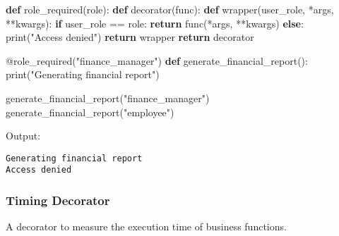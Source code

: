 \documentclass[
  letterpaper,
  DIV=11,
  numbers=noendperiod]{scrreprt}
\newenvironment{Shaded}{\begin{snugshade}}{\end{snugshade}}
\newcommand{\AttributeTok}[1]{\textcolor[rgb]{0.40,0.45,0.13}{#1}}
\newcommand{\BuiltInTok}[1]{\textcolor[rgb]{0.00,0.23,0.31}{#1}}
\newcommand{\ControlFlowTok}[1]{\textcolor[rgb]{0.00,0.23,0.31}{\textbf{#1}}}
\newcommand{\KeywordTok}[1]{\textcolor[rgb]{0.00,0.23,0.31}{\textbf{#1}}}
\newcommand{\NormalTok}[1]{\textcolor[rgb]{0.00,0.23,0.31}{#1}}
\newcommand{\OperatorTok}[1]{\textcolor[rgb]{0.37,0.37,0.37}{#1}}
\newcommand{\StringTok}[1]{\textcolor[rgb]{0.13,0.47,0.30}{#1}}
\begin{document}
\begin{Shaded}
\begin{Highlighting}[]
\KeywordTok{def}\NormalTok{ role\_required(role):}
    \KeywordTok{def}\NormalTok{ decorator(func):}
        \KeywordTok{def}\NormalTok{ wrapper(user\_role, }\OperatorTok{*}\NormalTok{args, }\OperatorTok{**}\NormalTok{kwargs):}
            \ControlFlowTok{if}\NormalTok{ user\_role }\OperatorTok{==}\NormalTok{ role:}
                \ControlFlowTok{return}\NormalTok{ func(}\OperatorTok{*}\NormalTok{args, }\OperatorTok{**}\NormalTok{kwargs)}
            \ControlFlowTok{else}\NormalTok{:}
                \BuiltInTok{print}\NormalTok{(}\StringTok{"Access denied"}\NormalTok{)}
        \ControlFlowTok{return}\NormalTok{ wrapper}
    \ControlFlowTok{return}\NormalTok{ decorator}

\AttributeTok{@role\_required}\NormalTok{(}\StringTok{"finance\_manager"}\NormalTok{)}
\KeywordTok{def}\NormalTok{ generate\_financial\_report():}
    \BuiltInTok{print}\NormalTok{(}\StringTok{"Generating financial report"}\NormalTok{)}

\NormalTok{generate\_financial\_report(}\StringTok{"finance\_manager"}\NormalTok{)}
\NormalTok{generate\_financial\_report(}\StringTok{"employee"}\NormalTok{)}
\end{Highlighting}
\end{Shaded}

Output:

\begin{verbatim}
Generating financial report
Access denied
\end{verbatim}

\subsubsection{Timing Decorator}\label{timing-decorator}

A decorator to measure the execution time of business functions.
\end{document}
